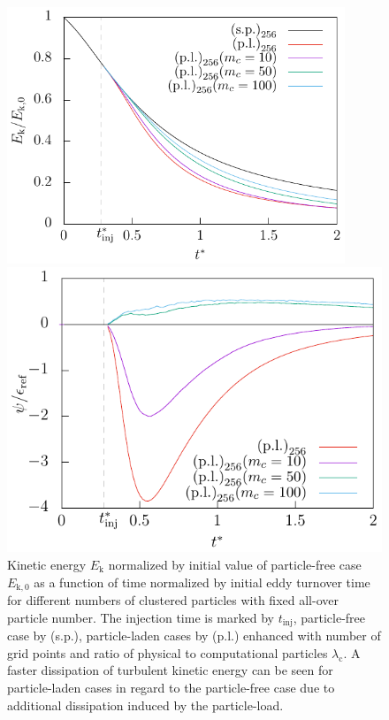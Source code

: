 \documentclass[11pt,a4paper,openany,oneside,parskip=half*]{article}
\begin{document}
\begin{figure}[h]
    \centering
    \begin{minipage}{.5\textwidth}
        \centering
 	   \includegraphics[width=0.9\textwidth]{./Abbildungen/256/kineticEnergy_time.pdf}
	   \caption{Kinetic energy $E_\mathrm{k}$ normalized by initial value of particle-free case $E_  \mathrm{k,0}$ as a function of time normalized by initial eddy turnover time for different numbers of clustered particles with fixed all-over particle number. The injection time is marked by $t_\mathrm{inj}$, particle-free case by (s.p.), particle-laden cases by (p.l.) enhanced with number of grid points and ratio of physical to computational particles $\lambda_\mathrm{c}$. A faster dissipation of turbulent kinetic energy can be seen for particle-laden cases in regard to the particle-free case due to additional dissipation induced by the particle-load.}
	\label{kineticEnergy_time_128}
    \end{minipage}%
    \begin{minipage}{0.5\textwidth}
        \centering
        \includegraphics[width=\linewidth]{./Abbildungen/256/coupling_time.pdf}

\end{minipage}
\end{figure}
\end{document}

